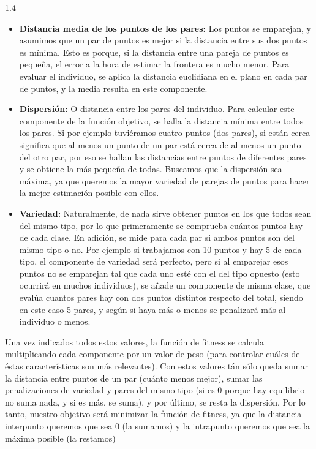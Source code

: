 \documentclass{article}
\begin{document}
\begin{spacing}{1.4}
\begin{itemize}
  \item \textbf{Distancia media de los puntos de los pares:} Los puntos se emparejan,
  y asumimos que un par de puntos es mejor si la distancia entre sus dos puntos es mínima. Esto es porque, si la distancia
  entre una pareja de puntos es pequeña, el error a la hora de estimar la frontera es mucho menor.
  Para evaluar el individuo, se aplica la distancia euclidiana en el plano en cada par de puntos, y la media
  resulta en este componente.
  \item \textbf{Dispersión:} O distancia entre los pares del individuo. Para calcular este componente de la función objetivo,
  se halla la distancia mínima entre todos los pares. Si por ejemplo tuviéramos cuatro puntos (dos pares), si están cerca
  significa que al menos un punto de un par está cerca de al menos un punto del otro par, por eso se hallan las distancias
  entre puntos de diferentes pares y se obtiene la más pequeña de todas. Buscamos que la dispersión sea máxima, ya que queremos
  la mayor variedad de parejas de puntos para hacer la mejor estimación posible con ellos.
  \item \textbf{Variedad:} Naturalmente, de nada sirve obtener puntos en los que todos sean del mismo tipo, por lo que primeramente se comprueba cuántos puntos
  hay de cada clase. En adición, se mide para cada par si ambos puntos son del mismo tipo o no. Por ejemplo si trabajamos con 10 puntos
  y hay 5 de cada tipo, el componente de variedad será perfecto, pero si al emparejar esos puntos no se emparejan tal que cada uno esté
  con el del tipo opuesto (esto ocurrirá en muchos individuos), se añade un componente de misma clase, que evalúa cuantos pares hay
  con dos puntos distintos respecto del total, siendo en este caso 5 pares, y según si haya más o menos se penalizará más al individuo o menos.
\end{itemize}

Una vez indicados todos estos valores, la función de fitness se calcula multiplicando cada componente por un
valor de peso (para controlar cuáles de éstas características son más relevantes). Con estos valores
tán sólo queda sumar la distancia entre puntos de un par (cuánto menos mejor), sumar las penalizaciones de variedad
y pares del mismo tipo (si es 0 porque hay equilibrio no suma nada, y si es más, se suma),
y por último, se resta la dispersión. Por lo tanto, nuestro objetivo será minimizar la función de fitness, ya que
la distancia interpunto queremos que sea 0 (la sumamos) y la intrapunto queremos que sea la máxima posible (la restamos)


\end{spacing}
\end{document}

